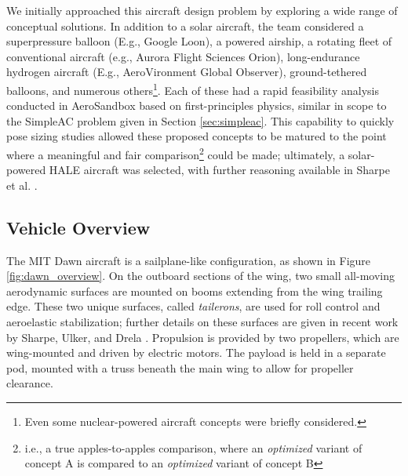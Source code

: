 We initially approached this aircraft design problem by exploring a wide range of conceptual solutions. In addition to a solar aircraft, the team considered a superpressure balloon (E.g., Google Loon), a powered airship, a rotating fleet of conventional aircraft (e.g., Aurora Flight Sciences Orion), long-endurance hydrogen aircraft (E.g., AeroVironment Global Observer), ground-tethered balloons, and numerous others\footnote{Even some nuclear-powered aircraft concepts were briefly considered.}. Each of these had a rapid feasibility analysis conducted in AeroSandbox based on first-principles physics, similar in scope to the SimpleAC problem given in Section \ref{sec:simpleac}. This capability to quickly pose sizing studies allowed these proposed concepts to be matured to the point where a meaningful and fair comparison\footnote{i.e., a true apples-to-apples comparison, where an \emph{optimized} variant of concept A is compared to an \emph{optimized} variant of concept B} could be made; ultimately, a solar-powered HALE aircraft was selected, with further reasoning available in Sharpe et al. \cite{sharpe_optimization_2021}.

\subsection{Vehicle Overview}

The MIT Dawn aircraft is a sailplane-like configuration, as shown in Figure \ref{fig:dawn_overview}. On the outboard sections of the wing, two small all-moving aerodynamic surfaces are mounted on booms extending from the wing trailing edge. These two unique surfaces, called \emph{tailerons}, are used for roll control and aeroelastic stabilization; further details on these surfaces are given in recent work by Sharpe, Ulker, and Drela \cite{sharpe_tailerons_2023}. Propulsion is provided by two propellers, which are wing-mounted and driven by electric motors. The payload is held in a separate pod, mounted with a truss beneath the main wing to allow for propeller clearance.

